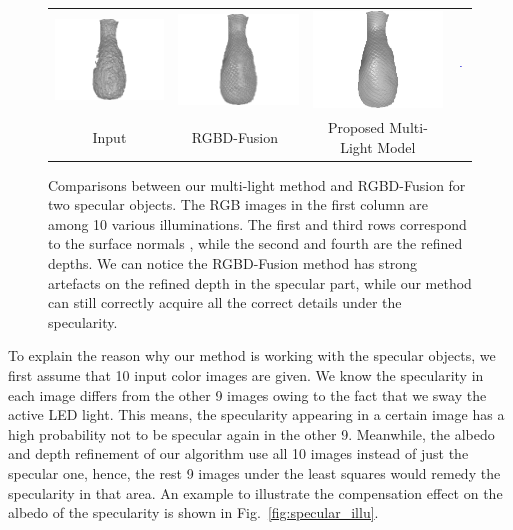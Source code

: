 \begin{figure}[!ht]
{\begin{tabular}{c|c c c}
   \includegraphics[height = 0.19\linewidth]{figures/result/robust_vase_shape_init.pdf} 
   &
   \includegraphics[height = 0.19\linewidth]{figures/result/rgbd_vase_shape.pdf} &
   \includegraphics[height = 0.19\linewidth]{figures/result/robust_vase_shape.pdf}&
      \includegraphics[width=0.17\textwidth]{figures/result/robust_vase_normal_crop.png}
   \\


   {Input} & {RGBD-Fusion~\cite{or2015rgbd}} & {Proposed Multi-Light Model} &{}              
 \end{tabular}}
\caption{Comparisons between our multi-light method and RGBD-Fusion for two specular objects. The RGB images in the first column are among 10 various illuminations. The first and third rows correspond to the surface normals , while the second and fourth are the refined depths. 
We can notice the RGBD-Fusion method has strong artefacts on the refined depth in the specular part, while our method can still correctly acquire all the correct details under the specularity.
}
\label{fig:comp_specular}
\end{figure}




To explain the reason why our method is working with the specular objects, we first assume that 10 input color images are given.
We know the specularity in each image differs from the other 9 images owing to the fact that we sway the active LED light.
This means, the specularity appearing in a certain image has a high probability not to be specular again in the other 9.
Meanwhile, the albedo and depth refinement of our algorithm use all 10 images instead of just the specular one,
hence, the rest 9 images under the least squares would remedy the specularity in that area.
An example to illustrate the compensation effect on the albedo of the specularity is shown in Fig.~\ref{fig:specular_illu}.
